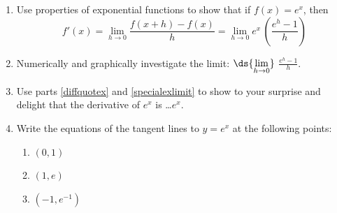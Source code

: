 \documentclass{ximera}
\begin{document}
\begin{problem}\label{derivativeofex}
\begin{enumerate}  \item\label{diffquotex}  Use properties of exponential functions to show that if $f(x) = e^{x}$, then \[ f'(x) = \lim_{h \rightarrow 0} \frac{f(x+h) - f(x)}{h} = \lim_{h \rightarrow 0} e^{x} \, \left( \frac{e^{h} - 1}{h} \right)\]

\item\label{specialexlimit}    Numerically and graphically investigate the limit: $\ds{\lim_{h \rightarrow 0}}$ $\frac{e^{h} - 1}{h}$.

\item  Use parts \ref{diffquotex} and \ref{specialexlimit} to show to your surprise and delight that the derivative of $e^{x}$ is \ldots  $e^{x}$.

\item  Write the equations of the tangent lines to $y = e^{x}$ at the following points:

\begin{enumerate}

\item  $(0,1)$

\item  $(1, e)$

\item $\left(-1, e^{-1} \right)$

\end{enumerate}

\end{enumerate}   
\end{problem}

 
\end{document}
